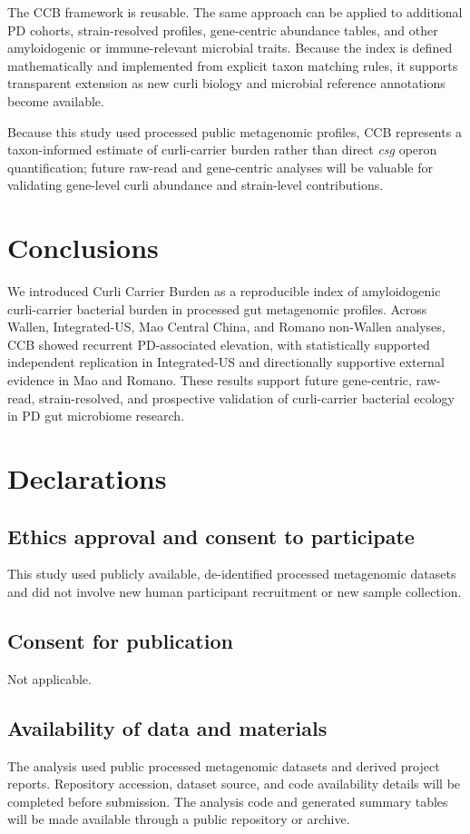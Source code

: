 \documentclass[12pt]{article}
\begin{document}
The CCB framework is reusable. The same approach can be applied to additional PD cohorts, strain-resolved profiles, gene-centric abundance tables, and other amyloidogenic or immune-relevant microbial traits. Because the index is defined mathematically and implemented from explicit taxon matching rules, it supports transparent extension as new curli biology and microbial reference annotations become available.

Because this study used processed public metagenomic profiles, CCB represents a taxon-informed estimate of curli-carrier burden rather than direct \textit{csg} operon quantification; future raw-read and gene-centric analyses will be valuable for validating gene-level curli abundance and strain-level contributions.

\section*{Conclusions}
We introduced Curli Carrier Burden as a reproducible index of amyloidogenic curli-carrier bacterial burden in processed gut metagenomic profiles. Across Wallen, Integrated-US, Mao Central China, and Romano non-Wallen analyses, CCB showed recurrent PD-associated elevation, with statistically supported independent replication in Integrated-US and directionally supportive external evidence in Mao and Romano. These results support future gene-centric, raw-read, strain-resolved, and prospective validation of curli-carrier bacterial ecology in PD gut microbiome research.

\section*{Declarations}
\subsection*{Ethics approval and consent to participate}
This study used publicly available, de-identified processed metagenomic datasets and did not involve new human participant recruitment or new sample collection.

\subsection*{Consent for publication}
Not applicable.

\subsection*{Availability of data and materials}
The analysis used public processed metagenomic datasets and derived project reports. Repository accession, dataset source, and code availability details will be completed before submission. The analysis code and generated summary tables will be made available through a public repository or archive.
\end{document}
